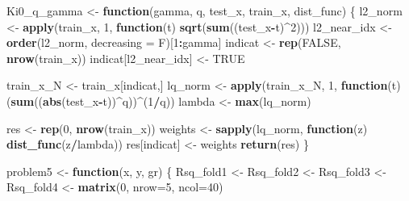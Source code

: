 \documentclass[
]{article}
\newenvironment{Shaded}{\begin{snugshade}}{\end{snugshade}}
\newcommand{\AttributeTok}[1]{\textcolor[rgb]{0.13,0.29,0.53}{#1}}
\newcommand{\ConstantTok}[1]{\textcolor[rgb]{0.56,0.35,0.01}{#1}}
\newcommand{\ControlFlowTok}[1]{\textcolor[rgb]{0.13,0.29,0.53}{\textbf{#1}}}
\newcommand{\DecValTok}[1]{\textcolor[rgb]{0.00,0.00,0.81}{#1}}
\newcommand{\FunctionTok}[1]{\textcolor[rgb]{0.13,0.29,0.53}{\textbf{#1}}}
\newcommand{\NormalTok}[1]{#1}
\newcommand{\OtherTok}[1]{\textcolor[rgb]{0.56,0.35,0.01}{#1}}
\newcommand{\SpecialCharTok}[1]{\textcolor[rgb]{0.81,0.36,0.00}{\textbf{#1}}}
\begin{document}
\begin{Shaded}
\begin{Highlighting}[]
\NormalTok{Ki0\_q\_gamma }\OtherTok{\textless{}{-}} \ControlFlowTok{function}\NormalTok{(gamma, q, test\_x, train\_x, dist\_func) \{}
\NormalTok{  l2\_norm }\OtherTok{\textless{}{-}} \FunctionTok{apply}\NormalTok{(train\_x, }\DecValTok{1}\NormalTok{, }\ControlFlowTok{function}\NormalTok{(t) }\FunctionTok{sqrt}\NormalTok{(}\FunctionTok{sum}\NormalTok{((test\_x}\SpecialCharTok{{-}}\NormalTok{t)}\SpecialCharTok{\^{}}\DecValTok{2}\NormalTok{)))}
\NormalTok{  l2\_near\_idx }\OtherTok{\textless{}{-}} \FunctionTok{order}\NormalTok{(l2\_norm, }\AttributeTok{decreasing =}\NormalTok{ F)[}\DecValTok{1}\SpecialCharTok{:}\NormalTok{gamma]}
\NormalTok{  indicat }\OtherTok{\textless{}{-}} \FunctionTok{rep}\NormalTok{(}\ConstantTok{FALSE}\NormalTok{, }\FunctionTok{nrow}\NormalTok{(train\_x))}
\NormalTok{  indicat[l2\_near\_idx] }\OtherTok{\textless{}{-}} \ConstantTok{TRUE}
  
\NormalTok{  train\_x\_N }\OtherTok{\textless{}{-}}\NormalTok{ train\_x[indicat,]}
\NormalTok{  lq\_norm }\OtherTok{\textless{}{-}} \FunctionTok{apply}\NormalTok{(train\_x\_N, }\DecValTok{1}\NormalTok{, }\ControlFlowTok{function}\NormalTok{(t) (}\FunctionTok{sum}\NormalTok{((}\FunctionTok{abs}\NormalTok{(test\_x}\SpecialCharTok{{-}}\NormalTok{t))}\SpecialCharTok{\^{}}\NormalTok{q))}\SpecialCharTok{\^{}}\NormalTok{(}\DecValTok{1}\SpecialCharTok{/}\NormalTok{q))}
\NormalTok{  lambda }\OtherTok{\textless{}{-}} \FunctionTok{max}\NormalTok{(lq\_norm)}
  
\NormalTok{  res }\OtherTok{\textless{}{-}} \FunctionTok{rep}\NormalTok{(}\DecValTok{0}\NormalTok{, }\FunctionTok{nrow}\NormalTok{(train\_x))}
\NormalTok{  weights }\OtherTok{\textless{}{-}} \FunctionTok{sapply}\NormalTok{(lq\_norm, }\ControlFlowTok{function}\NormalTok{(z) }\FunctionTok{dist\_func}\NormalTok{(z}\SpecialCharTok{/}\NormalTok{lambda))}
\NormalTok{  res[indicat] }\OtherTok{\textless{}{-}}\NormalTok{ weights}
  \FunctionTok{return}\NormalTok{(res)}
\NormalTok{\}}

\NormalTok{problem5 }\OtherTok{\textless{}{-}} \ControlFlowTok{function}\NormalTok{(x, y, gr) \{}
\NormalTok{  Rsq\_fold1 }\OtherTok{\textless{}{-}}\NormalTok{ Rsq\_fold2 }\OtherTok{\textless{}{-}}\NormalTok{ Rsq\_fold3 }\OtherTok{\textless{}{-}}\NormalTok{ Rsq\_fold4 }\OtherTok{\textless{}{-}}
    \FunctionTok{matrix}\NormalTok{(}\DecValTok{0}\NormalTok{, }\AttributeTok{nrow=}\DecValTok{5}\NormalTok{, }\AttributeTok{ncol=}\DecValTok{40}\NormalTok{)}
  

\end{Highlighting}
\end{Shaded}
\end{document}
